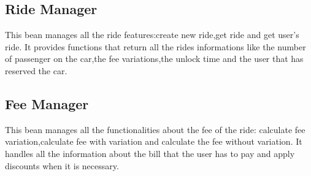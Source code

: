 \subsection{Ride Manager}
This bean manages all the ride features:create new ride,get ride and get user's ride. It  provides functions that return all the rides informations like the number of passenger on the car,the fee variations,the unlock time and the user that has reserved the car.
\subsection{Fee Manager}
This bean manages all the functionalities about the fee of the ride: calculate fee variation,calculate fee with variation and calculate the fee without variation. It handles all the information about the bill that the user has to pay and apply discounts when it is necessary.

